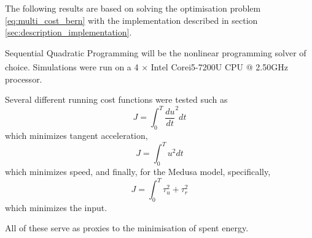 \cleardoublepage
\label{chap:results}

\par The following results are based on solving the optimisation problem \eqref{eq:multi_cost_bern} with the implementation described in section \ref{sec:description_implementation}.
\par Sequential Quadratic Programming \cite{10.1007/978-0-387-35514-6_7} will be the nonlinear programming solver of choice. Simulations were run on a 4 × Intel\textsuperscript{\textcopyright} Core\texttrademark i5-7200U CPU @ 2.50GHz processor. 


\par Several different running cost functions were tested such as 
\begin{equation}
    J = \int_0^T \frac{du}{dt}^2 dt
\end{equation}
which minimizes tangent acceleration,
\begin{equation}
    J = \int_0^T u^2 dt
\end{equation}
which minimizes speed, and finally, for the Medusa model, specifically,
\begin{equation}
    J = \int_0^T \tau_u^2 + \tau_r^2
\end{equation}
which minimizes the input.
\par All of these serve as proxies to the minimisation of spent energy.

